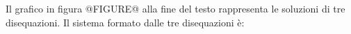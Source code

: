 Il grafico in figura @FIGURE@ alla fine del testo
rappresenta le soluzioni di tre disequazioni.
Il sistema formato dalle tre disequazioni è: